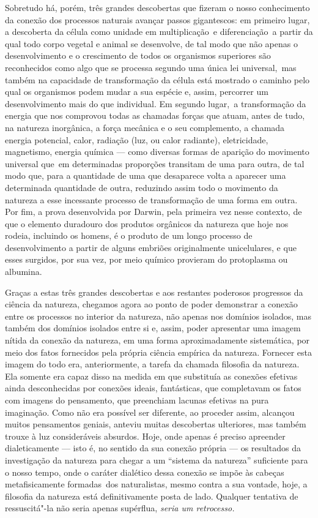 Sobretudo há, porém, três grandes descobertas que fizeram o nosso
conhecimento da conexão dos processos naturais avançar passos
gigantescos: em primeiro lugar, a descoberta da célula como unidade em
multiplicação \textbar{}\,e diferenciação\,\textbar{} a partir da qual todo corpo vegetal
e animal se desenvolve, de tal modo que não apenas o desenvolvimento e
o crescimento de todos os organismos superiores são reconhecidos como
algo que se processa segundo uma única lei universal, \textbar{}\,mas também na
capacidade de transformação da célula está mostrado o caminho pelo qual
os organismos podem mudar a sua espécie e, assim, percorrer um
desenvolvimento mais do que individual. Em segundo lugar,\,\textbar{} a
transformação da energia que nos comprovou todas as chamadas forças que %
atuam, antes de tudo, na natureza inorgânica, a força mecânica e o seu
complemento, a chamada energia potencial, calor, radiação (luz, ou calor
radiante), eletricidade, magnetismo, energia química --- como diversas
formas de aparição do movimento universal que\est\ em determinadas
proporções transitam 
de uma para outra, de tal modo que, para a quantidade de uma que
desaparece volta a aparecer uma determinada quantidade de outra,
reduzindo assim todo o movimento da natureza a esse incessante processo
de transformação de uma forma em outra. Por fim, a prova desenvolvida por Darwin,
pela primeira vez nesse contexto,
de que o elemento duradouro dos produtos orgânicos da 
natureza que hoje nos rodeia, incluindo os homens, é o produto de um
longo processo de desenvolvimento a partir de alguns embriões
originalmente unicelulares, e que esses surgidos, por sua vez, por meio
químico provieram do protoplasma ou albumina. %

Graças a estas três grandes descobertas e aos restantes poderosos
progressos da ciência da natureza, chegamos agora ao ponto de poder
demonstrar a conexão entre os processos no interior da natureza, não
apenas nos domínios isolados, mas também dos domínios isolados entre si
e, assim, poder apresentar uma imagem nítida da conexão da natureza, em
uma forma aproximadamente sistemática, por meio dos fatos fornecidos
pela própria ciência empírica da natureza. Fornecer esta imagem do todo
era, anteriormente, a tarefa da chamada filosofia da natureza. Ela
somente era capaz disso na medida em que substituía as conexões
efetivas ainda desconhecidas por conexões ideais, fantásticas, que
completavam os fatos com imagens do pensamento, que preenchiam lacunas
efetivas na pura imaginação. Como não era possível ser diferente, ao
proceder assim, alcançou muitos pensamentos geniais, anteviu muitas
descobertas ulteriores, mas também trouxe à luz consideráveis absurdos.
Hoje, onde apenas é preciso apreender dialeticamente --- isto é, no sentido
da sua conexão própria --- os resultados da investigação da natureza para
chegar a um ``sistema da natureza'' suficiente para o nosso tempo, onde
o caráter dialético dessa conexão se impõe às cabeças metafisicamente
formadas\est\ dos naturalistas, mesmo contra a sua vontade, hoje, a filosofia
da natureza está definitivamente posta de lado. Qualquer tentativa de
ressuscitá"-la não seria apenas supérflua, \emph{seria um retrocesso.}

